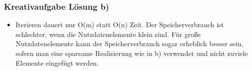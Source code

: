 \begin{frame}
	\frametitle{Kreativaufgabe Lösung b)}
	\begin{itemize}
		\item Iterieren dauert nur O(m) statt O(n) Zeit. Der Speicherverbrauch ist schlechter, wenn die
			Nutzdatenelemente klein sind. Für große Nutzdatenelemente kann der Speicherverbrauch sogar erheblich besser sein,
			sofern man eine sparsame Realisierung wie in b) verwendet und nicht zuviele Elemente eingefügt werden.
	\end{itemize}
\end{frame}



